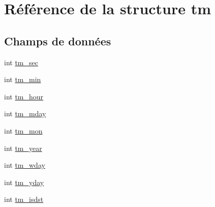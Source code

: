 \hypertarget{structtm}{\section{Référence de la structure tm}
\label{structtm}
}
\subsection*{Champs de données}
\begin{DoxyCompactItemize}
\item 
int \hyperlink{structtm_a4d098a9a5c03a00b2ee61e10851de81e}{tm\-\_\-sec}
\item 
int \hyperlink{structtm_af414eb7c86cc3099595211eee4d4211b}{tm\-\_\-min}
\item 
int \hyperlink{structtm_a3e7ca4e37f1abcaf56b8a916c38eb9fe}{tm\-\_\-hour}
\item 
int \hyperlink{structtm_ab8d8904bad43b0c8b96e61941c5b5310}{tm\-\_\-mday}
\item 
int \hyperlink{structtm_a112ac36fa2f593777138a417cf031e17}{tm\-\_\-mon}
\item 
int \hyperlink{structtm_a33adf78fd6476b2120ce3b9c4a852053}{tm\-\_\-year}
\item 
int \hyperlink{structtm_afe81a8c46f1c693c43f259b288859f4f}{tm\-\_\-wday}
\item 
int \hyperlink{structtm_a93a0ba77cc23796df84405dcbcc57eb1}{tm\-\_\-yday}
\item 
int \hyperlink{structtm_a5645ca0580c8ab2c24f6c2965d9c9f9c}{tm\-\_\-isdst}
\end{DoxyCompactItemize}



